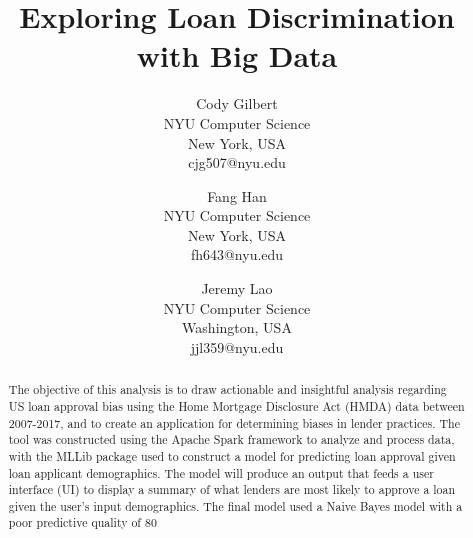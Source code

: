 \documentclass[conference,compsoc]{IEEEtran}
\begin{document}
%
\title{Exploring Loan Discrimination with Big Data}


\author{
      Cody Gilbert \\
        NYU Computer Science \\
        New York, USA \\
        cjg507@nyu.edu \\
            \and
        Fang Han\\
        NYU Computer Science \\
        New York, USA \\
        fh643@nyu.edu\\
             \and
        Jeremy Lao \\
        NYU Computer Science  \\
        Washington, USA \\
        jjl359@nyu.edu



}




\maketitle

\begin{abstract}
The objective of this analysis is to draw actionable and insightful analysis regarding US loan approval bias using the Home Mortgage Disclosure Act (HMDA) data between 2007-2017, and to create an application for determining biases in lender practices. The tool was constructed using the Apache Spark framework to analyze and process data, with the MLLib package used to construct a model for predicting loan approval given loan applicant demographics. The model will produce an output that feeds a user interface (UI) to display a summary of what lenders are most likely to approve a loan given the user's input demographics. The final model used a Naive Bayes model with a poor predictive quality of 80%


\end{abstract}
\end{document}
